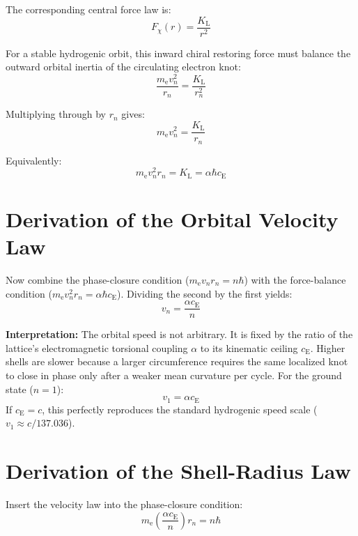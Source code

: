 The corresponding central force law is:
\begin{equation}
    F_{\chi}(r) = \frac{K_{\mathrm{L}}}{r^2}
\end{equation}

For a stable hydrogenic orbit, this inward chiral restoring force must balance the outward orbital inertia of the circulating electron knot:
\begin{equation}
    \frac{m_{\mathrm{e}} v_n^2}{r_n} = \frac{K_{\mathrm{L}}}{r_n^2}
\end{equation}

Multiplying through by $r_n$ gives:
\begin{equation}
    m_{\mathrm{e}} v_n^2 = \frac{K_{\mathrm{L}}}{r_n}
\end{equation}

Equivalently:
\begin{equation}
    m_{\mathrm{e}} v_n^2 r_n = K_{\mathrm{L}} = \alpha\hbar c_{\mathrm{E}}
\end{equation}

\section{Derivation of the Orbital Velocity Law}
Now combine the phase-closure condition ($m_{\mathrm{e}} v_n r_n = n\hbar$) with the force-balance condition ($m_{\mathrm{e}} v_n^2 r_n = \alpha\hbar c_{\mathrm{E}}$). Dividing the second by the first yields:
\begin{equation}
    v_n = \frac{\alpha c_{\mathrm{E}}}{n}
\end{equation}

\noindent\textbf{Interpretation:} The orbital speed is not arbitrary. It is fixed by the ratio of the lattice's electromagnetic torsional coupling $\alpha$ to its kinematic ceiling $c_{\mathrm{E}}$. Higher shells are slower because a larger circumference requires the same localized knot to close in phase only after a weaker mean curvature per cycle. For the ground state ($n=1$):
\begin{equation}
    v_1 = \alpha c_{\mathrm{E}}
\end{equation}
If $c_{\mathrm{E}} = c$, this perfectly reproduces the standard hydrogenic speed scale ($v_1 \approx c/137.036$).

\section{Derivation of the Shell-Radius Law}
Insert the velocity law into the phase-closure condition:
\begin{equation}
    m_{\mathrm{e}} \left(\frac{\alpha c_{\mathrm{E}}}{n}\right) r_n = n\hbar
\end{equation}

